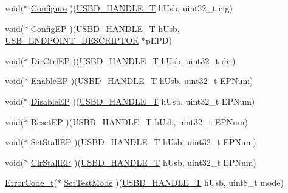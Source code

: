 \begin{DoxyCompactItemize}
\item 
void($\ast$ \hyperlink{struct_u_s_b_d___h_w___a_p_i_a25d9ab77af329aa3aa97d8cf8c69bd39}{Configure} )(\hyperlink{group___u_s_b_d___core_gafdbb2204d929cb9d75736bd2b42342ac}{U\+S\+B\+D\+\_\+\+H\+A\+N\+D\+L\+E\+\_\+T} h\+Usb, uint32\+\_\+t cfg)
\item 
void($\ast$ \hyperlink{struct_u_s_b_d___h_w___a_p_i_a1d22a234f082345d2e3b44693f52437a}{Config\+EP} )(\hyperlink{group___u_s_b_d___core_gafdbb2204d929cb9d75736bd2b42342ac}{U\+S\+B\+D\+\_\+\+H\+A\+N\+D\+L\+E\+\_\+T} h\+Usb, \hyperlink{group___u_s_b_d___core_ga652b2871268bd903653cbff0f3448a6e}{U\+S\+B\+\_\+\+E\+N\+D\+P\+O\+I\+N\+T\+\_\+\+D\+E\+S\+C\+R\+I\+P\+T\+OR} $\ast$p\+E\+PD)
\item 
void($\ast$ \hyperlink{struct_u_s_b_d___h_w___a_p_i_a232054acbf6a7ee115c2079ef29eacb3}{Dir\+Ctrl\+EP} )(\hyperlink{group___u_s_b_d___core_gafdbb2204d929cb9d75736bd2b42342ac}{U\+S\+B\+D\+\_\+\+H\+A\+N\+D\+L\+E\+\_\+T} h\+Usb, uint32\+\_\+t dir)
\item 
void($\ast$ \hyperlink{struct_u_s_b_d___h_w___a_p_i_a98007fb59ff30d019d166c907dc9ae74}{Enable\+EP} )(\hyperlink{group___u_s_b_d___core_gafdbb2204d929cb9d75736bd2b42342ac}{U\+S\+B\+D\+\_\+\+H\+A\+N\+D\+L\+E\+\_\+T} h\+Usb, uint32\+\_\+t E\+P\+Num)
\item 
void($\ast$ \hyperlink{struct_u_s_b_d___h_w___a_p_i_a7873edd36bbc6392e0ec2768c8a5d770}{Disable\+EP} )(\hyperlink{group___u_s_b_d___core_gafdbb2204d929cb9d75736bd2b42342ac}{U\+S\+B\+D\+\_\+\+H\+A\+N\+D\+L\+E\+\_\+T} h\+Usb, uint32\+\_\+t E\+P\+Num)
\item 
void($\ast$ \hyperlink{struct_u_s_b_d___h_w___a_p_i_a629b49eb3e97f88baebfd125643787ae}{Reset\+EP} )(\hyperlink{group___u_s_b_d___core_gafdbb2204d929cb9d75736bd2b42342ac}{U\+S\+B\+D\+\_\+\+H\+A\+N\+D\+L\+E\+\_\+T} h\+Usb, uint32\+\_\+t E\+P\+Num)
\item 
void($\ast$ \hyperlink{struct_u_s_b_d___h_w___a_p_i_a320c4cb40c872179e8a53e3ab028e1c2}{Set\+Stall\+EP} )(\hyperlink{group___u_s_b_d___core_gafdbb2204d929cb9d75736bd2b42342ac}{U\+S\+B\+D\+\_\+\+H\+A\+N\+D\+L\+E\+\_\+T} h\+Usb, uint32\+\_\+t E\+P\+Num)
\item 
void($\ast$ \hyperlink{struct_u_s_b_d___h_w___a_p_i_a72e54621b0cb3e82ac1cc1595d9a1067}{Clr\+Stall\+EP} )(\hyperlink{group___u_s_b_d___core_gafdbb2204d929cb9d75736bd2b42342ac}{U\+S\+B\+D\+\_\+\+H\+A\+N\+D\+L\+E\+\_\+T} h\+Usb, uint32\+\_\+t E\+P\+Num)
\item 
\hyperlink{error_8h_a905255056c349318139d94aa4523d516}{Error\+Code\+\_\+t}($\ast$ \hyperlink{struct_u_s_b_d___h_w___a_p_i_a09ee889ca9547f99112dd8d0655f7e7b}{Set\+Test\+Mode} )(\hyperlink{group___u_s_b_d___core_gafdbb2204d929cb9d75736bd2b42342ac}{U\+S\+B\+D\+\_\+\+H\+A\+N\+D\+L\+E\+\_\+T} h\+Usb, uint8\+\_\+t mode)

\end{DoxyCompactItemize}
